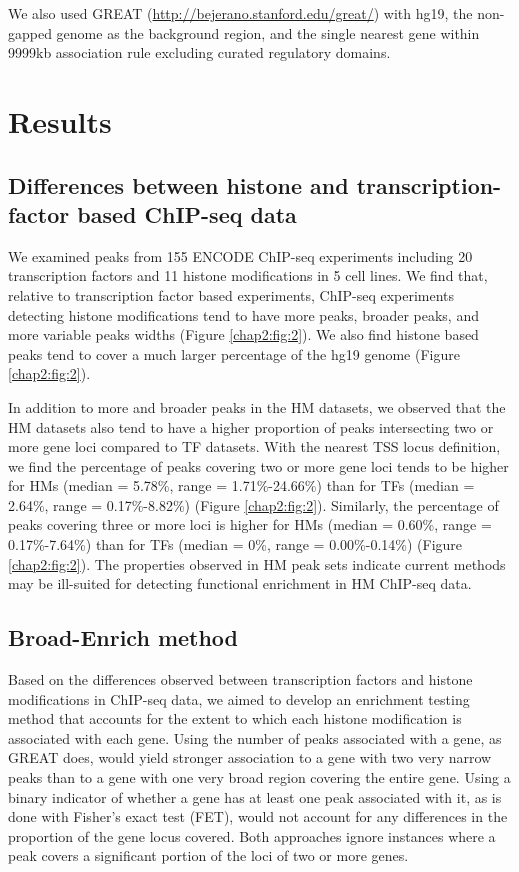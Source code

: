 We also used GREAT (\url{http://bejerano.stanford.edu/great/}) with hg19, the non-gapped genome as the background region, and the single nearest gene within 9999kb association rule excluding curated regulatory domains.

\section{Results}

\subsection{Differences between histone and transcription-factor based ChIP-seq data}
\label{broadenrich_results_differences}

We examined peaks from 155 ENCODE ChIP-seq experiments including 20 transcription factors and 11 histone modifications in 5 cell lines. We find that, relative to transcription factor based experiments, ChIP-seq experiments detecting histone modifications tend to have more peaks, broader peaks, and more variable peaks widths (Figure \ref{chap2:fig:2}). We also find histone based peaks tend to cover a much larger percentage of the hg19 genome (Figure \ref{chap2:fig:2}).

In addition to more and broader peaks in the HM datasets, we observed that the HM datasets also tend to have a higher proportion of peaks intersecting two or more gene loci compared to TF datasets. With the nearest TSS locus definition, we find the percentage of peaks covering two or more gene loci tends to be higher for HMs (median = 5.78\%, range = 1.71\%-24.66\%) than for TFs (median = 2.64\%, range = 0.17\%-8.82\%) (Figure \ref{chap2:fig:2}). Similarly, the percentage of peaks covering three or more loci is higher for HMs (median = 0.60\%, range = 0.17\%-7.64\%) than for TFs (median = 0\%, range = 0.00\%-0.14\%) (Figure \ref{chap2:fig:2}). The properties observed in HM peak sets indicate current methods may be ill-suited for detecting functional enrichment in HM ChIP-seq data.

\subsection{Broad-Enrich method}
\label{broadenrich_results_method}

Based on the differences observed between transcription factors and histone modifications in ChIP-seq data, we aimed to develop an enrichment testing method that accounts for the extent to which each histone modification is associated with each gene. Using the number of peaks associated with a gene, as GREAT does, would yield stronger association to a gene with two very narrow peaks than to a gene with one very broad region covering the entire gene. Using a binary indicator of whether a gene has at least one peak associated with it, as is done with Fisher’s exact test (FET), would not account for any differences in the proportion of the gene locus covered.  Both approaches ignore instances where a peak covers a significant portion of the loci of two or more genes.

